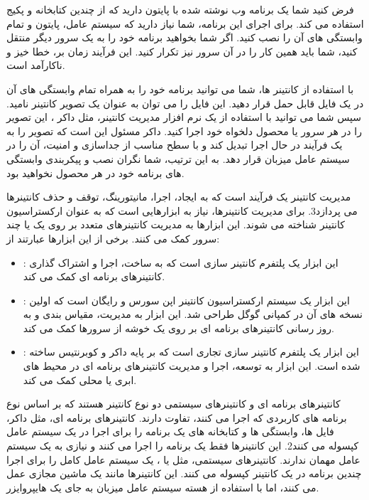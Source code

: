   \begin{example}
    \centering
    \label{example:docker}
 فرض کنید شما یک برنامه وب نوشته شده با پایتون دارید که از چندین کتابخانه و پکیج استفاده می کند. برای اجرای این برنامه، شما نیاز دارید که سیستم عامل، پایتون و تمام وابستگی های آن را نصب کنید. اگر شما بخواهید برنامه خود را به یک سرور دیگر منتقل کنید، شما باید همین کار را در آن سرور نیز تکرار کنید. این فرآیند زمان بر، خطا خیز و ناکارآمد است.

\end{example}

با استفاده از کانتینر ها، شما می توانید برنامه خود را به همراه تمام وابستگی های آن در یک فایل قابل حمل قرار دهید. این فایل را می توان به عنوان یک تصویر  کانتینر نامید. سپس شما می توانید با استفاده از یک نرم افزار مدیریت کانتینر، مثل داکر ، این تصویر را در هر سرور یا محصول دلخواه خود اجرا کنید. داکر مسئول این است که تصویر را به یک فرآیند در حال اجرا  تبدیل کند و با سطح مناسب از جداسازی و امنیت، آن را در سیستم عامل میزبان قرار دهد. به این ترتیب، شما نگران نصب و پیکربندی وابستگی های برنامه خود در هر محصول نخواهید بود.


مدیریت کانتینر یک فرآیند است که به ایجاد، اجرا، مانیتورینگ، توقف و حذف کانتینرها می پردازد3. برای مدیریت کانتینرها، نیاز به ابزارهایی است که به عنوان ارکستراسیون کانتینر شناخته می شوند. این ابزارها به مدیریت کانتینرهای متعدد بر روی یک یا چند سرور کمک می کنند. برخی از این ابزارها عبارتند از:
\begin{itemize}[label=-]
\item
{}: این ابزار یک پلتفرم کانتینر سازی است که به ساخت، اجرا و اشتراک گذاری کانتینرهای برنامه ای کمک می کند.
\item
{}: این ابزار یک سیستم ارکستراسیون کانتینر اپن سورس و رایگان است که اولین نسخه های آن در کمپانی گوگل طراحی شد. این ابزار به مدیریت، مقیاس بندی و به روز رسانی کانتینرهای برنامه ای بر روی یک خوشه از سرورها کمک می کند.
\item
{}: این ابزار یک پلتفرم کانتینر سازی تجاری است که بر پایه داکر و کوبرنتیس ساخته شده است. این ابزار به توسعه، اجرا و مدیریت کانتینرهای برنامه ای در محیط های ابری یا محلی کمک می کند.
\end{itemize}
کانتینرهای برنامه ای و کانتینرهای سیستمی دو نوع کانتینر هستند که بر اساس نوع برنامه های کاربردی که اجرا می کنند، تفاوت دارند. کانتینرهای برنامه ای، مثل داکر، فایل ها، وابستگی ها و کتابخانه های یک برنامه را برای اجرا در یک سیستم عامل کپسوله می کنند2. این کانتینرها فقط یک برنامه را اجرا می کنند و نیازی به یک سیستم عامل مهمان ندارند. کانتینرهای سیستمی، مثل  یا ، یک سیستم عامل کامل را برای اجرا چندین برنامه در یک کانتینر کپسوله می کنند. این کانتینرها مانند یک ماشین مجازی عمل می کنند، اما با استفاده از هسته سیستم عامل میزبان به جای یک هایپروایزر.

